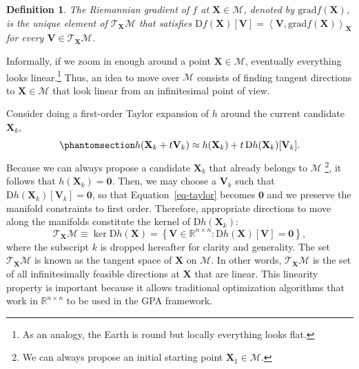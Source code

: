 \documentclass[
  12pt,
  letterpaper,
  article]{scrartcl}
\newtheorem{definition}{Definition}
\begin{document}
\begin{definition}
The Riemannian gradient of $f$ at $\mathbf{X}\in\mathcal{M}$, denoted by $\text{grad}f(\mathbf{X})$, is the unique element of $\mathcal{T}_{\mathbf{X}}\mathcal{M}$ that satisfies $\mathrm{D}f(\mathbf{X})[\mathbf{V}] = \left\langle \mathbf{V}, \text{grad}f(\mathbf{X}) \right\rangle_{\mathbf{X}}$ for every $\mathbf{V}\in\mathcal{T}_{\mathbf{X}}\mathcal{M}$.
\label{def:riemannian-gradient}
\end{definition}

Informally, if we zoom in enough around a point
\(\mathbf{X} \in \mathcal{M}\), eventually everything looks
linear.\footnote{As an analogy, the Earth is round but locally
  everything looks flat.} Thus, an idea to move over \(\mathcal{M}\)
consists of finding tangent directions to \(\mathbf{X} \in \mathcal{M}\)
that look linear from an infinitesimal point of view.

Consider doing a first-order Taylor expansion of \(h\) around the
current candidate \(\mathbf{X}_k\),
\begin{equation}\protect\phantomsection\label{eq-taylor}{
h(\mathbf{X}_k+t\mathbf{V}_k) \approx h(\mathbf{X}_k) + t\,\mathrm{D}h(\mathbf{X}_k)[\mathbf{V}_k].
}\end{equation} Because we can always propose a candidate
\(\mathbf{X}_k\) that already belongs to \(\mathcal{M}\) \footnote{We
  can always propose an initial starting point
  \(\mathbf{X}_1 \in \mathcal{M}\).}, it follows that
\(h(\mathbf{X}_k) = \mathbf{0}\). Then, we may choose a \(\mathbf{V}_k\)
such that \(\mathrm{D}h(\mathbf{X}_k)[\mathbf{V}_k] = \mathbf{0}\), so
that Equation~\ref{eq-taylor} becomes \(\mathbf{0}\) and we preserve the
manifold constraints to first order. Therefore, appropriate directions
to move along the manifolds constitute the kernel of
\(\mathrm{D}h(\mathbf{X}_k)\): \[
\mathcal{T}_{\mathbf{X}}\mathcal{M} \equiv \ker\mathrm{D}h(\mathbf{X}) = \left\{ \mathbf{V}\in\mathbb{R}^{n\times n}: \mathrm{D}h(\mathbf{X})[\mathbf{V}] = \mathbf{0} \right\},
\] where the subscript \(k\) is dropped hereafter for clarity and
generality. The set \(\mathcal{T}_\mathbf{X}\mathcal{M}\) is known as
the tangent space of \(\mathbf{X}\) on \(\mathcal{M}\). In other words,
\(\mathcal{T}_{\mathbf{X}}\mathcal{M}\) is the set of all
infinitesimally feasible directions at \(\mathbf{X}\) that are linear.
This linearity property is important because it allows traditional
optimization algorithms that work in \(\mathbb{R}^{n\times n}\) to be
used in the GPA framework.
\end{document}
